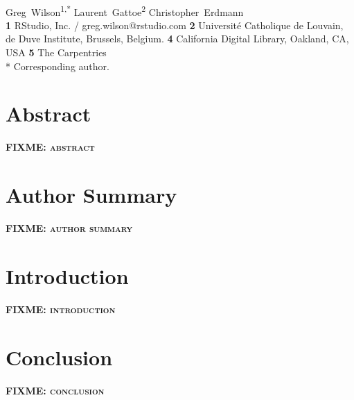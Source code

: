 \documentclass[10pt,letterpaper]{article}
\newcommand{\fixme}[1]{\textsc{\textbf{FIXME: {#1}}}}
\begin{document}
\vspace*{0.2in}

\begin{flushleft}
{\Large
\textbf{}
}
\newline
\\
{Greg~Wilson}\textsuperscript{1,*}
{Laurent~Gattoe}\textsuperscript{2}
{Christopher~Erdmann}
\\
\textbf{1} RStudio, Inc. / greg.wilson@rstudio.com
\textbf{2} Université Catholique de Louvain, de Duve Institute, Brussels, Belgium.
\textbf{4} California Digital Library, Oakland, CA, USA
\textbf{5} The Carpentries
\\
\bigskip
* Corresponding author.
\end{flushleft}

\section*{Abstract}

\fixme{abstract}

\section*{Author Summary}

\fixme{author summary}

\section*{Introduction}

\fixme{introduction}

\section*{Conclusion}

\fixme{conclusion}

\nocite{*} %

\end{document}
